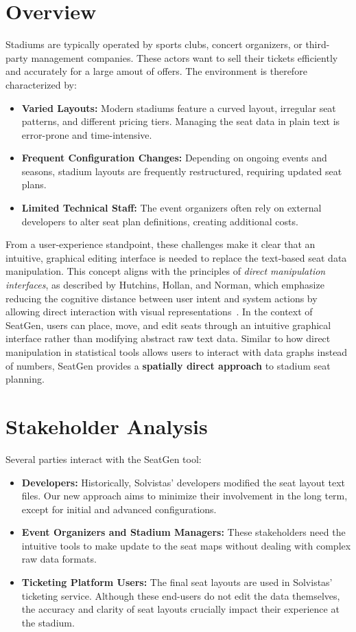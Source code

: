 \section{Overview}
Stadiums are typically operated by sports clubs, concert organizers, or third-party management companies. These actors want to sell their tickets efficiently and accurately for a large amout of offers. The environment is therefore characterized by:
\begin{itemize}
    \item \textbf{Varied Layouts:} Modern stadiums feature a curved layout, irregular seat patterns, and different pricing tiers. Managing the seat data in plain text is error-prone and time-intensive.
    \item \textbf{Frequent Configuration Changes:} Depending on ongoing events and seasons, stadium layouts are frequently restructured, requiring updated seat plans.
    \item \textbf{Limited Technical Staff:} The event organizers often rely on external developers to alter seat plan definitions, creating additional costs.
\end{itemize}

From a user-experience standpoint, these challenges make it clear that an intuitive, graphical editing interface is needed to replace the text-based seat data manipulation. This concept aligns with the principles of \emph{direct manipulation interfaces}, as described by Hutchins, Hollan, and Norman, which emphasize reducing the cognitive distance between user intent and system actions by allowing direct interaction with visual representations~\cite{Hutchins01121985}. In the context of SeatGen, users can place, move, and edit seats through an intuitive graphical interface rather than modifying abstract raw text data. Similar to how direct manipulation in statistical tools allows users to interact with data graphs instead of numbers, SeatGen provides a \textbf{spatially direct approach} to stadium seat planning.

\section{Stakeholder Analysis}
Several parties interact with the SeatGen tool:
\begin{itemize}
    \item \textbf{Developers:} Historically, Solvistas' developers modified the seat layout text files. Our new approach aims to minimize their involvement in the long term, except for initial and advanced configurations.
    \item \textbf{Event Organizers and Stadium Managers:} These stakeholders need the intuitive tools to make update to the seat maps without dealing with complex raw data formats.
    \item \textbf{Ticketing Platform Users:} The final seat layouts are used in Solvistas' ticketing service. Although these end-users do not edit the data themselves, the accuracy and clarity of seat layouts crucially impact their experience at the stadium.
\end{itemize}

